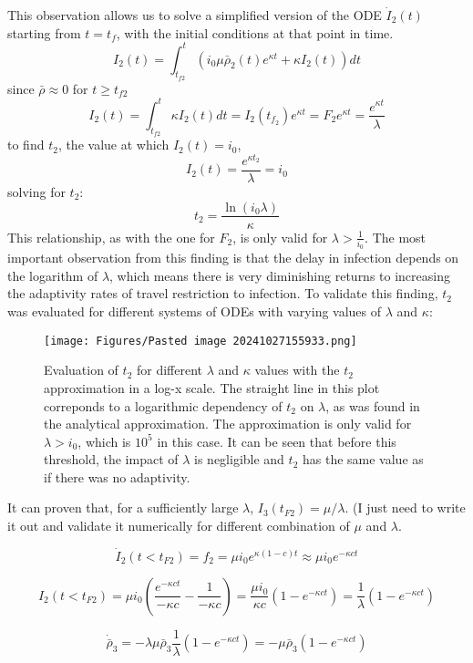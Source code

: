This observation allows us to solve a simplified version of the ODE $\dot I_2(t)$ starting from $t=t_f$, with the initial conditions at that point in time.
$$ I_2(t) = \int_{t_{f2}}^t \left(i_{0} \mu \bar \rho_{2}{(t)} e^{\kappa t} + \kappa I_{2}{\left(t \right)}\right) dt$$
since $\bar \rho \approx 0$ for $t\ge t_{f2}$ 
$$I_2(t) = \int_{t_{f2}}^t  \kappa I_{2}{\left(t \right)} dt = I_2(t_{f_2})e^{\kappa t} = F_2 e^{\kappa t} =\frac{e^{\kappa t}}{\lambda}$$
to find $t_2$, the value at which $I_2(t)=i_0$, 
$$I_2(t) =\frac{e^{\kappa t_2}}{\lambda}=i_0$$
solving for $t_2$:
$$t_2=\frac{\ln(i_0 \lambda)}{\kappa}$$
This relationship, as with the one for $F_2$, is only valid for $\lambda> \frac{1}{i_0}$. The most important observation from this finding is that the delay in infection depends on the logarithm of $\lambda$, which means there is very diminishing returns to increasing the adaptivity rates of travel restriction to infection. To validate this finding, $t_2$ was evaluated for different systems of ODEs with varying values of $\lambda$ and $\kappa$:

\begin{figure}[!ht]
    \centering
    \texttt{[image: Figures/Pasted image 20241027155933.png]}
    \caption{\small Evaluation of $t_2$ for different $\lambda$ and $\kappa$ values with the $t_2$ approximation in a log-x scale. The straight line in this plot correponds to a logarithmic dependency of $t_2$ on $\lambda$, as was found in the analytical approximation. The approximation is only valid for $\lambda > i_0$, which is $10^5$ in this case. It can be seen that before this threshold, the impact of $\lambda$ is negligible and $t_2$ has the same value as if there was no adaptivity.}
\end{figure}

It can proven that, for a sufficiently large $\lambda$, $I_3(t_{F2})=\mu/\lambda$. (I just need to write it out and validate it numerically for different combination of $\mu$ and $\lambda$.

$$\dot I_2(t<t_{F2}) = f_2 = \mu i_0 e^{\kappa (1-c) t} \approx \mu i_0 e^{-\kappa c t}$$

$$I_2(t<t_{F2}) = \mu i_0 \left( \frac{e^{-\kappa c t}}{-\kappa c} - \frac{1}{-\kappa c} \right) = \frac{\mu i_0}{\kappa c}\left(1 - e^{-\kappa c t}\right) = \frac{1}{\lambda}\left(1-e^{-\kappa c t}\right) $$

$$\dot{\bar{\rho}}_3 = - \lambda \mu \bar{\rho}_3 \frac{1}{\lambda}\left(1 - e^{-\kappa c t}\right) =  - \mu \bar{\rho}_3\left(1 - e^{-\kappa c t}\right)$$

